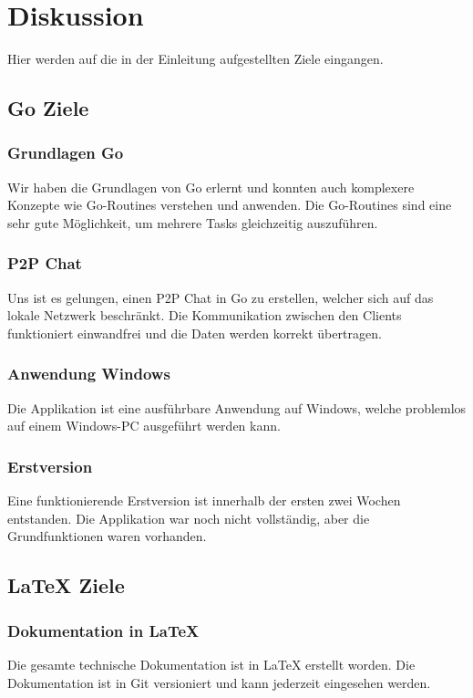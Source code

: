 \section{Diskussion}
Hier werden auf die in der Einleitung aufgestellten Ziele eingangen.


\subsection{Go Ziele}

\subsubsection{Grundlagen Go}
Wir haben die Grundlagen von Go erlernt und konnten auch komplexere Konzepte wie Go-Routines verstehen und anwenden. Die Go-Routines sind eine sehr gute Möglichkeit, um mehrere Tasks gleichzeitig auszuführen.


\subsubsection{P2P Chat}
Uns ist es gelungen, einen P2P Chat in Go zu erstellen, welcher sich auf das lokale Netzwerk beschränkt. Die Kommunikation zwischen den Clients funktioniert einwandfrei und die Daten werden korrekt übertragen.

\subsubsection{Anwendung Windows}
Die Applikation ist eine ausführbare Anwendung auf Windows, welche problemlos auf einem Windows-PC ausgeführt werden kann.

\subsubsection{Erstversion}
Eine funktionierende Erstversion ist innerhalb der ersten zwei Wochen entstanden. Die Applikation war noch nicht vollständig, aber die Grundfunktionen waren vorhanden.

\newpage
\subsection{LaTeX Ziele}

\subsubsection{Dokumentation in LaTeX}
Die gesamte technische Dokumentation ist in LaTeX erstellt worden. Die Dokumentation ist in Git versioniert und kann jederzeit eingesehen werden.

